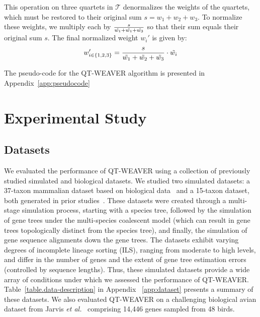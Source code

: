 \documentclass[10pt,a4paper]{article}
\begin{document}
This operation on three quartets in $\mathcal{T}$ denormalizes the weights of the quartets, which must be restored to their original sum $s = w_1+w_2+w_3$. %
To normalize these weights, we multiply each by $\frac{s}{\Tilde{w_1} + \Tilde{w_1} + \Tilde{w_3}}$ so that their sum equals their original sum $s$. The final normalized weight $w_i'$ is given by:
$$
w_{i \in \{1,2,3\}}'  = \frac{ s }{\Tilde{w_1} + \Tilde{w_2} + \Tilde{w_3}} \cdot \Tilde{w_i}
$$


The pseudo-code for the QT-WEAVER algorithm is presented in Appendix~\ref{app:pseudocode}


\section{Experimental Study}
\subsection{Datasets}
%

We evaluated the performance of QT-WEAVER using a collection of previously studied simulated and biological datasets. We studied two simulated datasets: a 37-taxon mammalian dataset based on biological data~\cite{song-mammal} and a 15-taxon dataset, both generated in prior studies~\cite{statistical-binning,bayzid2015weighted}. These datasets were created through a multi-stage simulation process, starting with a species tree, followed by the simulation of gene trees under the multi-species coalescent model (which can result in gene trees topologically distinct from the species tree), and finally, the simulation of gene sequence alignments down the gene trees. The datasets exhibit varying degrees of incomplete lineage sorting (ILS), ranging from moderate to high levels, and differ in the number of genes and the extent of gene tree estimation errors (controlled by sequence lengths). Thus, these simulated datasets provide a wide array of conditions under which we assessed the performance of QT-WEAVER. %
Table~\ref{table.data-description} in Appendix ~\ref{app:dataset} presents a summary of these datasets. 
We also evaluated QT-WEAVER on a challenging biological avian dataset from Jarvis \textit{et al.}~\cite{jarvis2014} comprising 14,446 genes sampled from 48 birds.
\end{document}
